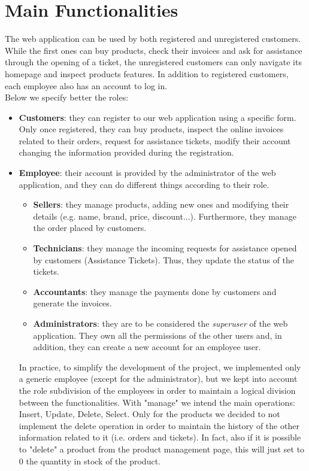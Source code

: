 \section{Main Functionalities}

The web application can be used by both registered and unregistered customers. While the first ones can buy products, check their invoices and ask for assistance through the opening of a ticket, the unregistered customers can only navigate its homepage and inspect products features. In addition to registered customers, each employee also has an account to log in.
\\
Below we specify better the roles:
\begin{itemize}
    \item \textbf{Customers}: they can register to our web application using a specific form. Only once registered, they can buy products, inspect the online invoices related to their orders, request for assistance tickets, modify their account changing the information provided during the registration.
    \item \textbf{Employee}: their account is provided by the administrator of the web application, and they can do different things according to their role.
    \begin{itemize}
        \item \textbf{Sellers}: they manage products, adding new ones and modifying  their details (e.g. name, brand, price, discount...). Furthermore, they manage the order placed by customers.
        \item \textbf{Technicians}: they manage the incoming requests for assistance opened by customers (Assistance Tickets). Thus, they update the status of the tickets.
        \item \textbf{Accountants}: they manage the payments done by customers and generate the invoices.
        \item \textbf{Administrators}: they are to be considered the \textit{superuser} of the web application. They own all the permissions of the other users and, in addition, they can create a new account for an employee user.
    \end{itemize}
    In practice, to simplify the development of the project, we implemented only a generic employee (except for the administrator), but we kept into account the role subdivision of the employees in order to maintain a logical division between the functionalities.
    With "manage" we intend the main operations: Insert, Update, Delete, Select. Only for the products  we decided to not implement the delete operation in order to maintain the history of the other information related to it (i.e. orders and tickets). In fact, also if it is possible to "delete" a product from the product management page, this will just set to 0 the quantity in stock of the product.
\end{itemize}
